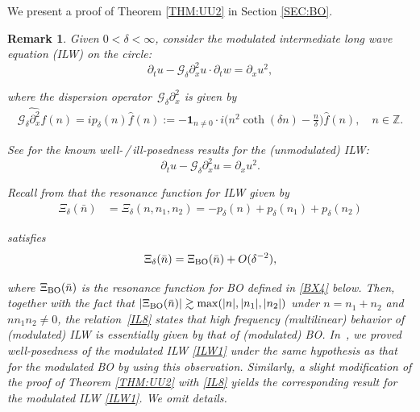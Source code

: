 \documentclass[letterpaper, 11pt,  reqno]{amsart}
\newtheorem{remark}[theorem]{Remark}
\newcommand{\1}{\hspace{0.5mm}\text{I}\hspace{0.5mm}}
\newcommand{\noi}{\noindent}
\newcommand{\Z}{\mathbb{Z}}
\newcommand{\dl}{\delta}
\newcommand{\ft}{\widehat}
\newcommand{\dx}{\partial_x}
\newcommand{\dt}{\partial_t}
\newcommand{\Gdl}{\mathcal{G}_{\dl} }
\newcommand{\ges}{\gtrsim}
\newcommand{\ind}{\mathbf 1}
\newcommand{\BO}{\text{\rm BO} }
\numberwithin{equation}{section}
\numberwithin{theorem}{section}
\begin{document}
We present a proof of Theorem \ref{THM:UU2}
in Section \ref{SEC:BO}.

\begin{remark}\rm
Given $0 < \dl < \infty$, 
 consider the 
modulated 
intermediate long wave equation (ILW) on the circle: 
\begin{equation}
\label{ILW1}
\dt u-    \Gdl\dx^2 u \cdot \dt w =\dx u^2, 
\end{equation}

\noi
where the dispersion operator~$\Gdl \dx^2$ is given 
by 
\begin{align*}
\ft{\Gdl \dx^2 f}(n) =
i p_\dl(n)  \ft f(n)
:=
- \ind_{n\ne 0}\cdot i \bigg(n^2 \coth(\dl n)  - \frac{n}{\dl }\bigg) \ft{f}(n), \quad n\in\Z.
\end{align*}

\noi
See
\cite{S19, Li24, LOZ, CLOP, CFLOP, FLZ, CLO}
for the known well-\,/\,ill-posedness
results
for the (unmodulated) ILW:
\begin{equation*}
\dt u-    \Gdl\dx^2 u  =\dx u^2.
\end{equation*}


Recall from  \cite[(5.22)]{CGLLO1}
that  the resonance function for ILW 
given by 
\begin{align*}
\Xi_\dl (\bar n)
& = \Xi_\dl(n,n_1,n_2) = - p_\dl(n)  +   p_\dl(n_1) +  p_\dl(n_2)
\end{align*}



\noi
satisfies 
\begin{align}
\Xi_\dl(\bar n) =  \Xi_\BO(\bar n) + O(\dl^{-2}), 
\label{IL8}
\end{align}

\noi
where
$\Xi_\BO(\bar n) $
is the resonance function for BO
defined in \eqref{BX4} below.
Then, together with the fact that 
$|\Xi_\BO(\bar n)| \ges \max(|n|, |n_1|, |n_2|)$
under $n = n_1 + n_2$ and $n n_1 n_2 \ne 0$, 
the relation~\eqref{IL8}
states
that high frequency (multilinear) behavior
of (modulated) ILW is essentially given by that of 
(modulated) 
BO.
In~\cite{CGLLO1}, 
we proved well-posedness
of the modulated ILW \eqref{ILW1}
under the same hypothesis as that for the modulated BO
by using this observation.
Similarly, 
 a slight modification of the proof
of Theorem \ref{THM:UU2}
 with \eqref{IL8}
yields the corresponding result
for the modulated ILW \eqref{ILW1}.
We omit details.






\end{remark}
\end{document}
